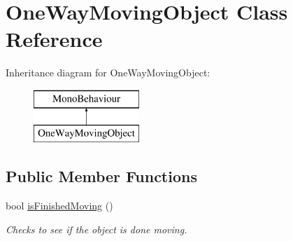 \hypertarget{class_one_way_moving_object}{}\section{One\+Way\+Moving\+Object Class Reference}
\label{class_one_way_moving_object}
Inheritance diagram for One\+Way\+Moving\+Object\+:\begin{figure}[H]
\begin{center}
\leavevmode
\includegraphics[height=2.000000cm]{class_one_way_moving_object}
\end{center}
\end{figure}
\subsection*{Public Member Functions}
\begin{DoxyCompactItemize}
\item 
bool \hyperlink{class_one_way_moving_object_a09d08513eaa584681898a1c13d33de1c}{is\+Finished\+Moving} ()
\begin{DoxyCompactList}\small\item\em Checks to see if the object is done moving. \end{DoxyCompactList}\end{DoxyCompactItemize}
